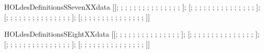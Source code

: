 \begin{SaveVerbatim}{HOLdesDefinitionsSSevenXXdata}
\HOLTokenTurnstile{}  \HOLSymConst{=}
   [[; ; ; ; ; ; ; ; ; ; ; ; ; ; ; ];
    [; ; ; ; ; ; ; ; ; ; ; ; ; ; ; ];
    [; ; ; ; ; ; ; ; ; ; ; ; ; ; ; ];
    [; ; ; ; ; ; ; ; ; ; ; ; ; ; ; ]]
\end{SaveVerbatim}
\newcommand{\HOLdesDefinitionsSSevenXXdata}{\UseVerbatim{HOLdesDefinitionsSSevenXXdata}}
\begin{SaveVerbatim}{HOLdesDefinitionsSEightXXdata}
\HOLTokenTurnstile{}  \HOLSymConst{=}
   [[; ; ; ; ; ; ; ; ; ; ; ; ; ; ; ];
    [; ; ; ; ; ; ; ; ; ; ; ; ; ; ; ];
    [; ; ; ; ; ; ; ; ; ; ; ; ; ; ; ];
    [; ; ; ; ; ; ; ; ; ; ; ; ; ; ; ]]
\end{SaveVerbatim}
\newcommand{\HOLdesDefinitionsSEightXXdata}{\UseVerbatim{HOLdesDefinitionsSEightXXdata}}
